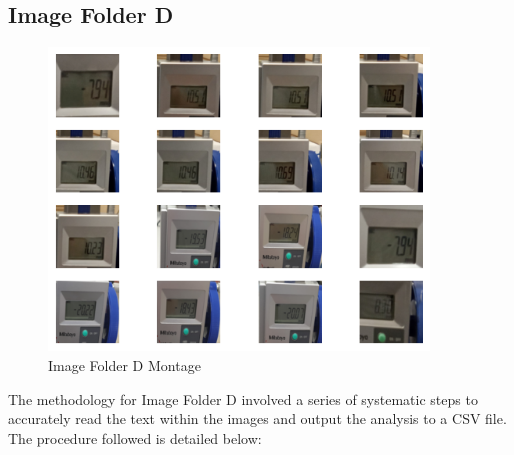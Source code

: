 \newpage

\subsection{Image Folder D}


\begin{figure}[ht]
    \centering
    \includegraphics[width=0.9\textwidth]{Figures/EDA_Charts/5/montage.png}
    \caption[Image Folder D Montage]{Image Folder D Montage}
    \label{fig:Image Folder D Montage}
\end{figure}

The methodology for Image Folder D involved a series of systematic steps to accurately read the text within the images and output the analysis to a CSV file. The procedure followed is detailed below:

